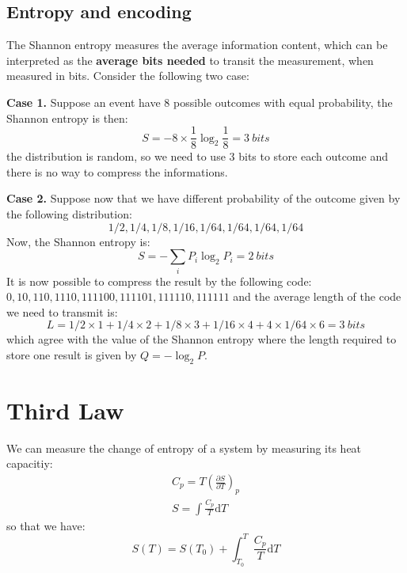 \documentclass{article}
\newcommand{\pfrac}[2]{\frac{\partial #1}{\partial #2}}
\newcommand{\dnor}{\text{d}}
\begin{document}
\subsection{Entropy and encoding}
The Shannon entropy measures the average information content, which can be interpreted as the \textbf{average bits needed} to
transit the measurement, when measured in bits. Consider the following two case:

\textbf{Case 1.} Suppose an event have 8 possible outcomes with equal probability, 
the Shannon entropy is then:
\begin{equation}
    S = - 8 \times \frac{1}{8} \log_2\frac{1}{8} = 3\ bits
\end{equation}
the distribution is random, so we need to use 3 bits to store each outcome and there is no way to compress the informations.

\textbf{Case 2.} Suppose now that we have different probability of the outcome given by the following distribution:
\begin{equation*}
    {1/2, 1/4, 1/8, 1/16, 1/64, 1/64, 1/64, 1/64}
\end{equation*}
Now, the Shannon entropy is:
\begin{equation}
    S = - \sum_i P_i \log_2 P_i = 2\ bits
\end{equation}
It is now possible to compress the result by the following code: $0, 10, 110, 1110, 111100, 111101, 111110, 111111$ and the average length
of the code we need to transmit is:
\begin{equation}
    L = 1/2 \times 1 + 1/4 \times 2 + 1/8 \times 3 + 1/16 \times 4 + 4 \times 1/64 \times 6= 3\ bits
\end{equation}
which agree with the value of the Shannon entropy where the length required to store one result is given by $Q = - \log_2 P$.


\section{Third Law}
We can measure the change of entropy of a system by measuring its heat capacitiy:
\begin{gather}
    C_p = T\left(\pfrac{S}{T}\right)_p \label{thirdlawcp}\\
    S = \int \frac{C_p}{T} \dnor T
\end{gather}
so that we have:
\begin{equation}
    S(T) = S(T_0) + \int_{T_0}^{T} \frac{C_p}{T} \dnor T
\end{equation}
\end{document}
